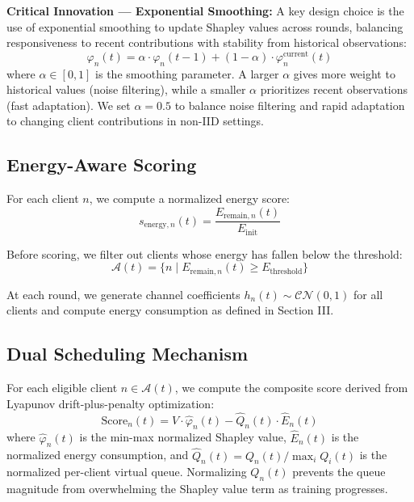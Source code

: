 \textbf{Critical Innovation — Exponential Smoothing:} A key design choice is the use of exponential smoothing to update Shapley values across rounds, balancing responsiveness to recent contributions with stability from historical observations:
\begin{equation}
\varphi_n(t) = \alpha \cdot \varphi_n(t-1) + (1 - \alpha) \cdot \varphi_n^{\text{current}}(t)
\end{equation}
where $\alpha \in [0, 1]$ is the smoothing parameter. A larger $\alpha$ gives more weight to historical values (noise filtering), while a smaller $\alpha$ prioritizes recent observations (fast adaptation). We set $\alpha = 0.5$ to balance noise filtering and rapid adaptation to changing client contributions in non-IID settings.

\subsection{Energy-Aware Scoring}

For each client $n$, we compute a normalized energy score:
\begin{equation}
s_{\text{energy},n}(t) = \frac{E_{\text{remain},n}(t)}{E_{\text{init}}}
\end{equation}

Before scoring, we filter out clients whose energy has fallen below the threshold:
\begin{equation}
\mathcal{A}(t) = \{n \mid E_{\text{remain},n}(t) \geq E_{\text{threshold}}\}
\end{equation}

At each round, we generate channel coefficients $h_n(t) \sim \mathcal{CN}(0, 1)$ for all clients and compute energy consumption as defined in Section III.

\subsection{Dual Scheduling Mechanism}

For each eligible client $n \in \mathcal{A}(t)$, we compute the composite score derived from Lyapunov drift-plus-penalty optimization:
\begin{equation}
\text{Score}_n(t) = V \cdot \hat{\varphi}_n(t) - \hat{Q}_n(t) \cdot \hat{E}_n(t)
\end{equation}
where $\hat{\varphi}_n(t)$ is the min-max normalized Shapley value, $\hat{E}_n(t)$ is the normalized energy consumption, and $\hat{Q}_n(t) = Q_n(t) / \max_{i} Q_i(t)$ is the normalized per-client virtual queue. Normalizing $Q_n(t)$ prevents the queue magnitude from overwhelming the Shapley value term as training progresses.

